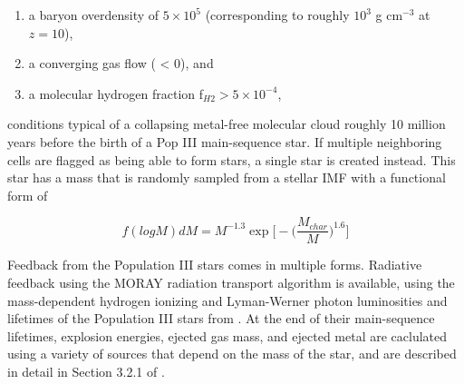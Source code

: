 \begin{enumerate}
\item a baryon overdensity of $5 \times 10^5$ (corresponding to
  roughly $10^3$ g cm$^{-3}$ at $z=10$),
\item a converging gas flow (\nabla \cdot {} < 0), and
\item a molecular hydrogen fraction f$_{H2} > 5 \times 10^{-4}$,
\end{enumerate}

conditions typical of a collapsing metal-free molecular cloud roughly
10 million years before the birth of a Pop III main-sequence star.  If
multiple neighboring cells are flagged as being able to form stars, a
single star is created instead.  This star has a mass that is randomly
sampled from a stellar IMF with a functional form of

\begin{equation}
f(log M) dM = M^{-1.3} \exp \Big[ -\Big( \frac{M_{char}}{M}  \Big)^{1.6} \Big]
\end{equation}

Feedback from the Population III stars comes in multiple forms.
Radiative feedback using the MORAY radiation transport algorithm
\citep{Wise11_Moray} is available, using the mass-dependent hydrogen
ionizing and Lyman-Werner photon luminosities and lifetimes of the
Population III stars from \citet{2002A&A...382...28S}.  At the end of
their main-sequence lifetimes, explosion energies, ejected gas mass,
and ejected metal are caclulated using a variety of sources that
depend on the mass of the star, and are described in detail in Section
3.2.1 of \citet{2012MNRAS.427..311W}.






